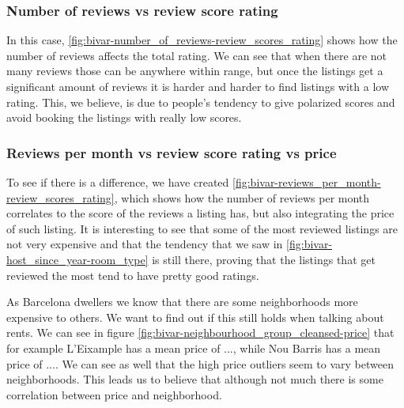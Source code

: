 \pagebreak
\subsubsection{Number of reviews vs review score rating}


 In this case, \cref{fig:bivar-number_of_reviews-review_scores_rating} shows how
 the number of reviews affects the total rating. We can see that when there are
 not many reviews those can be anywhere within range, but once the listings get
 a significant amount of reviews it is harder and harder to find listings with a
 low rating. This, we believe, is due to people's tendency to give polarized
 scores and avoid booking the listings with really low scores.

\pagebreak
\subsubsection{Reviews per month vs review score rating vs price}


 To see if there is a difference, we have created
 \cref{fig:bivar-reviews_per_month-review_scores_rating}, which shows how the
 number of reviews per month correlates to the score of the reviews a listing
 has, but also integrating the price of such listing. It is interesting to see
 that some of the most reviewed listings are not very expensive and that the
 tendency that we saw in \cref{fig:bivar-host_since_year-room_type} is still
 there, proving that the listings that get reviewed the most tend to have pretty
 good ratings.

\pagebreak


As Barcelona dwellers we know that there are some neighborhoods more expensive
to others. We want to find out if this still holds when talking about \airbnb
rents.  We can see in figure \cref{fig:bivar-neighbourhood_group_cleansed-price}
that for example L'Eixample has a mean price of ..., %
while Nou Barris has a mean price of ....  %
We can see as well that the high price outliers seem to vary between
neighborhoods. This leads us to believe that although not much there is some
correlation between price and neighborhood.

